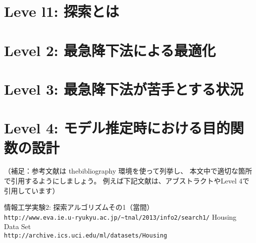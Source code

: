 \documentclass[10pt]{jarticle}
\begin{document}
\newpage

\section{Leve l1: 探索とは}



\newpage

\section{Level 2: 最急降下法による最適化}




\newpage

\section{Level 3: 最急降下法が苦手とする状況}
%
%

\newpage

\section{Level 4: モデル推定時における目的関数の設計}

%


\vspace{+1.0cm}
（補足：参考文献は thebibliography 環境を使って列挙し、
本文中で適切な箇所で引用するようにしましょう。
例えば下記文献は、アブストラクトやLevel 4で引用しています）
\begin{thebibliography}{99}
情報工学実験2: 探索アルゴリズムその1（當間）\\
\verb|http://www.eva.ie.u-ryukyu.ac.jp/~tnal/2013/info2/search1/|
Housing Data Set\\
\verb|http://archive.ics.uci.edu/ml/datasets/Housing|
\end{thebibliography}
\end{document}
